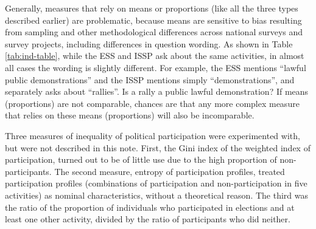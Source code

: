 \documentclass[12pt,]{article}
\begin{document}
Generally, measures that rely on means or proportions (like all the three types described earlier) are problematic, because means are sensitive to bias resulting from sampling and other methodological differences across national surveys and survey projects, including differences in question wording. As shown in Table \ref{tab:ind-table}, while the ESS and ISSP ask about the same activities, in almost all cases the wording is slightly different. For example, the ESS mentions ``lawful public demonstrations'' and the ISSP mentions simply ``demonstrations'', and separately asks about ``rallies''. Is a rally a public lawful demonstration? If means (proportions) are not comparable, chances are that any more complex measure that relies on these means (proportions) will also be incomparable.

Three measures of inequality of political participation were experimented with, but were not described in this note. First, the Gini index of the weighted index of participation, turned out to be of little use due to the high proportion of non-participants. The second measure, entropy of participation profiles, treated participation profiles (combinations of participation and non-participation in five activities) as nominal characteristics, without a theoretical reason. The third was the ratio of the proportion of individuals who participated in elections and at least one other activity, divided by the ratio of participants who did neither.
\end{document}

